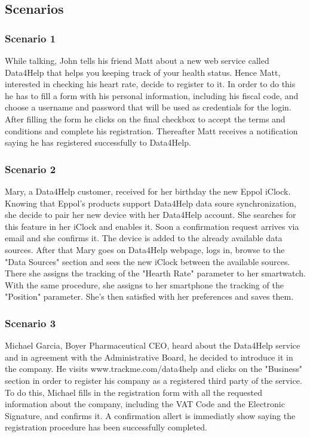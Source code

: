 \subsection{Scenarios}
\subsubsection{Scenario 1}
While talking, John tells his friend Matt about a new web service called Data4Help that helps you keeping track of your health status. Hence Matt, interested in checking his heart rate, decide to register to it. In order to do this he has to fill a form with his personal information, including his fiscal code, and choose a username and password  that will be used as credentials for the login. 
After filling the form he clicks on the final checkbox to accept the terms and conditions and complete his registration.
Thereafter Matt receives a notification saying he has registered successfully to Data4Help.
\subsubsection{Scenario 2}
Mary, a Data4Help customer, received for her birthday the new Eppol iClock. Knowing that Eppol's products support Data4Help data soure synchronization, she decide to pair her new device with her Data4Help account. She searches for this feature in her iClock and enables it.
Soon a confirmation request arrives via email and she confirms it. The device is added to the already available data sources.
After that Mary goes on Data4Help webpage, logs in, browse to the "Data Sources" section and sees the new iClock between the available sources. There she assigns the tracking of the "Hearth Rate" parameter to her smartwatch. With the same procedure, she assigns to her smartphone the tracking of the "Position" parameter.
She's then satisfied with her preferences and saves them.
\subsubsection{Scenario 3}
Michael Garcia, Boyer Pharmaceutical CEO, heard about the Data4Help service and in agreement with the Administrative Board, he decided to introduce it in the company. He visits  www.trackme.com/data4help and clicks on the "Business" section in order to register his company as a registered third party of the service. To do this, Michael fills in the registration form with all the requested information about the company, including the VAT Code and the Electronic Signature, and confirms it. A confirmation allert is immediatly show saying the registration procedure has been successfully completed.
